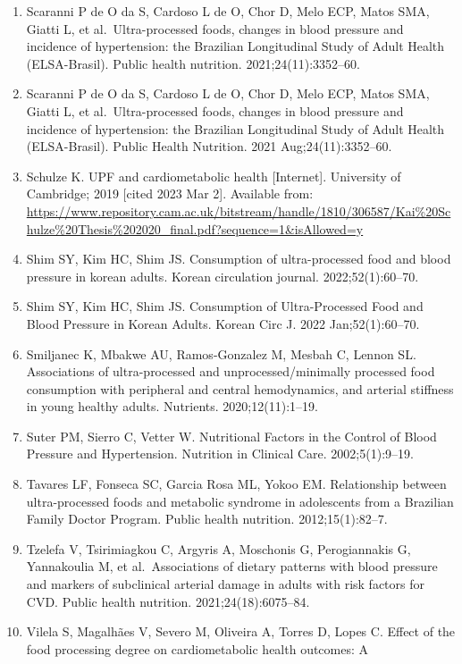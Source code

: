 \documentclass[
]{article}
\begin{document}
\begin{enumerate}
\item
  Scaranni P de O da S, Cardoso L de O, Chor D, Melo ECP, Matos SMA,
  Giatti L, et al.~Ultra-processed foods, changes in blood pressure and
  incidence of hypertension: the Brazilian Longitudinal Study of Adult
  Health (ELSA-Brasil). Public health nutrition. 2021;24(11):3352--60.
\item
  Scaranni P de O da S, Cardoso L de O, Chor D, Melo ECP, Matos SMA,
  Giatti L, et al.~Ultra-processed foods, changes in blood pressure and
  incidence of hypertension: the Brazilian Longitudinal Study of Adult
  Health (ELSA-Brasil). Public Health Nutrition. 2021
  Aug;24(11):3352--60.
\item
  Schulze K. UPF and cardiometabolic health {[}Internet{]}. University
  of Cambridge; 2019 {[}cited 2023 Mar 2{]}. Available from:
  \url{https://www.repository.cam.ac.uk/bitstream/handle/1810/306587/Kai\%20Schulze\%20Thesis\%202020_final.pdf?sequence=1\&isAllowed=y}
\item
  Shim SY, Kim HC, Shim JS. Consumption of ultra-processed food and
  blood pressure in korean adults. Korean circulation journal.
  2022;52(1):60--70.
\item
  Shim SY, Kim HC, Shim JS. Consumption of Ultra-Processed Food and
  Blood Pressure in Korean Adults. Korean Circ J. 2022 Jan;52(1):60--70.
\item
  Smiljanec K, Mbakwe AU, Ramos-Gonzalez M, Mesbah C, Lennon SL.
  Associations of ultra-processed and unprocessed/minimally processed
  food consumption with peripheral and central hemodynamics, and
  arterial stiffness in young healthy adults. Nutrients.
  2020;12(11):1--19.
\item
  Suter PM, Sierro C, Vetter W. Nutritional Factors in the Control of
  Blood Pressure and Hypertension. Nutrition in Clinical Care.
  2002;5(1):9--19.
\item
  Tavares LF, Fonseca SC, Garcia Rosa ML, Yokoo EM. Relationship between
  ultra-processed foods and metabolic syndrome in adolescents from a
  Brazilian Family Doctor Program. Public health nutrition.
  2012;15(1):82--7.
\item
  Tzelefa V, Tsirimiagkou C, Argyris A, Moschonis G, Perogiannakis G,
  Yannakoulia M, et al.~Associations of dietary patterns with blood
  pressure and markers of subclinical arterial damage in adults with
  risk factors for CVD. Public health nutrition. 2021;24(18):6075--84.
\item
  Vilela S, Magalhães V, Severo M, Oliveira A, Torres D, Lopes C. Effect
  of the food processing degree on cardiometabolic health outcomes: A

\end{enumerate}
\end{document}
